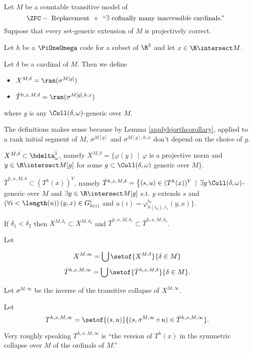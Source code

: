 \documentclass[oneside,12pt]{amsart}
\begin{document}
\begin{definition}
\label{TInfinity}
Let $M$ be a countable transitive model of
$$\ZFC - \text{ Replacement } +
\text{ ``} \exists \text{ cofinally many inaccessible cardinals.'' }$$
Suppose that every set-generic extension of $M$ is projectively correct.

Let $h$ be a $\PiOneOmega$ code for a subset
of $\R^2$ and let $x\in\R\intersect M$.


Let $\delta$ be a cardinal of $M$. Then we define
\begin{itemize}
\item $X^{M,\delta} = \ran(\sigma^{M[g]})$
\item $\bar{T}^{h,x,M,\delta}=\ran(\sigma^{M[g],h,x})$
\end{itemize}
where $g$ is any
$\Coll(\delta,\omega)$-generic over $M$.

The definitions makes sense because by Lemma \ref{applyhjorthcorollary},
applied to a rank initial segment of $M$,
$\sigma^{M[g]}$ and $\sigma^{M[g],h,x}$ don't depend on the choice of $g$.


$X^{M,\delta}\subset \bdelta^1_{\omega}$, namely
$X^{M,\delta}=\big\{ \varphi(y)\, \mid \, \varphi$ is a projective norm and $y\in\R\intersect M[g]$ for
some $g\subset\Coll(\delta,\omega)$ generic over $M \big\}$.


$\bar{T}^{h,x,M,\delta}\subset (T^h(x))^{V}$, namely
$\bar{T}^{h,x,M,\delta}=\big\{(s,u)\in (T^h(x))^{V} \, \mid \,
\exists g\, \Coll(\delta,\omega)$-generic over $M$ and $\exists y \in \R\intersect M[g]$ s.t.
$y$ extends $s$ and $(\forall i<\length(u))\, (y,x)\in G^{i}_{h(i)}$ and
$u(i)=\varphi^{i_0}_{h(i_0),i_1}(y,x) \big\}$.


If $\delta_1<\delta_2$ then $X^{M,\delta_1}\subset X^{M,\delta_2}$ and
$\bar{T}^{h,x,M,\delta_1}\subset \bar{T}^{h,x,M,\delta_2}$.

Let

$$X^{M,\infty}=\bigcup\setof{X^{M,\delta}}{\delta\in M}$$
$$\bar{T}^{h,x,M,\infty}=\bigcup\setof{\bar{T}^{h,x,M,\delta}}{\delta\in M}.$$

Let $\sigma^{M,\infty}$ be the inverse of the transitive collapse of $X^{M,\infty}$.

Let
$$T^{h,x,M,\infty}=\setof{(s,u)}{(s,\sigma^{M,\infty}\circ u)\in \bar{T}^{h,x,M,\infty}}.$$
\end{definition}

Very roughly speaking $T^{h,x,M,\infty}$ is ``the version of $T^h(x)$ in the symmetric collapse
over $M$ of the ordinals of $M$.''
\end{document}
